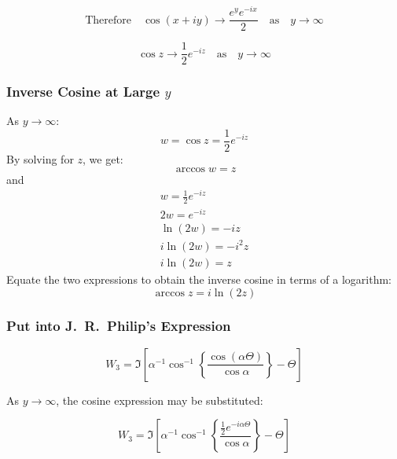 \documentclass[a4paper]{report}
\begin{document}
\begin{equation}
\text{Therefore} \quad \cos (x + iy) \to  \frac{e^{y} e^{-ix}}{2}
\quad \text{as} \quad y \to \infty
\end{equation}

\begin{equation}
\cos z \to \frac{1}{2} e^{-iz} \quad \text{as} \quad y \to \infty
\end{equation}


\subsubsection*{Inverse Cosine at Large $y$}

As $y \to \infty$:
\begin{equation}
w = \cos z = \frac{1}{2} e^{-iz}
\end{equation}
By solving for $z$, we get:
\begin{equation*}
\arccos w = z
\end{equation*}
and
\begin{gather*}
w = \frac{1}{2} e^{-iz} \\
2 w = e^{-iz} \\
\ln (2w) = -iz \\
i \ln (2w) = -i^2 z \\
i \ln (2w) = z
\end{gather*}
Equate the two expressions to obtain the inverse cosine in terms of a logarithm:
\begin{equation}
\arccos z = i \ln(2z)
\end{equation}

\subsubsection*{Put into J.\ R.\ Philip's Expression}

\begin{equation}
W_{3} = \Im \left[  
 \alpha^{-1} \cos^{-1} 
 \left\{ \frac{\cos(\alpha \Theta)}{\cos \alpha} \right\} - \Theta
   \right]
\end{equation}

As $y \to \infty$, the cosine expression may be substituted:

\begin{equation}
W_{3} = \Im \left[  
 \alpha^{-1} \cos^{-1} 
 \left\{ \frac{\frac{1}{2} e^{-i \alpha \Theta}}{\cos \alpha} \right\} - \Theta
   \right]
\end{equation}
\end{document}
